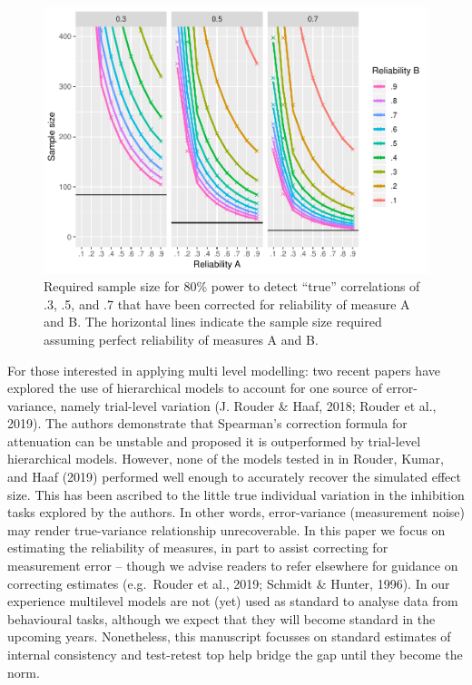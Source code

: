 \documentclass[english,,man,floatsintext]{apa6}
\begin{document}
\begin{figure}
\centering
\includegraphics{Parsons_Kruijt_Fox_-_reporting_reliability_files/figure-latex/figuretwo-1.pdf}
\caption{\label{fig:figuretwo}Required sample size for 80\% power to detect \enquote{true} correlations of .3, .5, and .7 that have been corrected for reliability of measure A and B. The horizontal lines indicate the sample size required assuming perfect reliability of measures A and B.}
\end{figure}

For those interested in applying multi level modelling: two recent papers have explored the use of hierarchical models to account for one source of error-variance, namely trial-level variation (J. Rouder \& Haaf, 2018; Rouder et al., 2019). The authors demonstrate that Spearman's correction formula for attenuation can be unstable and proposed it is outperformed by trial-level hierarchical models. However, none of the models tested in in Rouder, Kumar, and Haaf (2019) performed well enough to accurately recover the simulated effect size. This has been ascribed to the little true individual variation in the inhibition tasks explored by the authors. In other words, error-variance (measurement noise) may render true-variance relationship unrecoverable. In this paper we focus on estimating the reliability of measures, in part to assist correcting for measurement error -- though we advise readers to refer elsewhere for guidance on correcting estimates (e.g.~Rouder et al., 2019; Schmidt \& Hunter, 1996). In our experience multilevel models are not (yet) used as standard to analyse data from behavioural tasks, although we expect that they will become standard in the upcoming years. Nonetheless, this manuscript focusses on standard estimates of internal consistency and test-retest top help bridge the gap until they become the norm.
\end{document}

